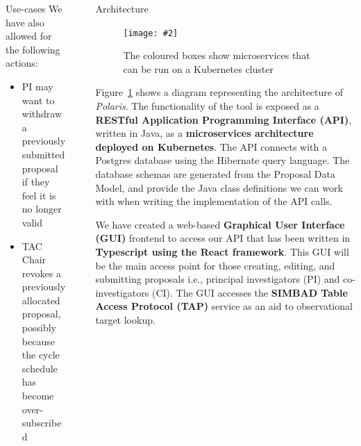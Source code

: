 \documentclass[final]{beamer}
\newlength{\sepwidth}
\newlength{\colwidth}
\newcommand{\separatorcolumn}{\begin{column}{\sepwidth}\end{column}}
\newcommand{\insertFigure}[3][width=1.0\textwidth]{%
    \begin{figure}[ht]
    \centering
    \texttt{[image: \#2]}
    \caption{#3}
    \label{fig:#2}
    \end{figure}
}
\begin{document}
\begin{frame}[t]
\begin{columns}[t]
\begin{column}{\colwidth}
\begin{block}{Use-cases}
                    We have also allowed for the following actions:

                    \begin{itemize}
                        \item PI may want to withdraw a previously submitted proposal if they feel it is no longer valid
                        \item TAC Chair revokes a previously allocated proposal, possibly because the cycle schedule has become over-subscribed
                    \end{itemize}

                \end{block}

            \end{column}

            \separatorcolumn

            \begin{column}{\colwidth}

                \begin{block}{Architecture}

                    \insertFigure[width=30cm,height=35cm]{architecture}{The coloured boxes show microservices that can be run on a Kubernetes cluster}

                    Figure~\ref{fig:architecture} shows a diagram representing the architecture of \emph{Polaris}.
                    The functionality of the tool is exposed as a \textbf{RESTful Application Programming Interface (API)},
                    written in Java, as a \textbf{microservices architecture deployed on Kubernetes}.
                    The API connects with a Postgres database using the Hibernate query language.
                    The database schemas are generated from the Proposal Data Model, and provide the Java class
                    definitions we can work with when writing the implementation of the API calls.

                    We have created a web-based \textbf{Graphical User Interface (GUI)} frontend to access our API
                    that has been written in \textbf{Typescript using the React framework}.
                    This GUI will be the main access point for those creating, editing, and submitting proposals i.e.,
                    principal investigators (PI) and co-investigators (CI).
                    The GUI accesses the \textbf{SIMBAD Table Access Protocol (TAP)} service as an aid to observational
                    target lookup.


\end{block}
\end{column}
\end{columns}
\end{frame}
\end{document}
